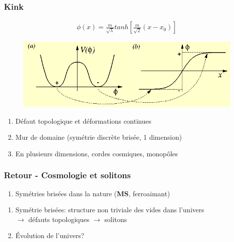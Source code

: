 \documentclass[handout]{beamer}
\begin{document}
%

\begin{frame}\frametitle{Kink}
\begin{align*}
\phi(x) = \frac{m}{\sqrt{\lambda}}tanh\left[\frac{m}{\sqrt{2}}(x-x_0)\right]
\end{align*}
\begin{figure}
\includegraphics[scale=0.4]{soli_def.png}
\end{figure}


\begin{enumerate}
\item Défaut topologique et déformations continues
\item Mur de domaine (symétrie discrète brisée, 1 dimension)
\item En plusieurs dimensions, cordes cosmiques, monopôles
\end{enumerate}
\end{frame}

\begin{frame}\frametitle{Retour - Cosmologie et solitons}
\begin{enumerate}
\item Symétries brisées dans la nature (\textbf{MS}, ferroaimant)
\end{enumerate}
\begin{enumerate}
\item Symétrie brisées: structure non triviale des vides dans l'univers\\
$\rightarrow$ défauts topologiques $\rightarrow$ solitons
\item Évolution de l'univers?
\end{enumerate}



\end{frame}
\end{document}
